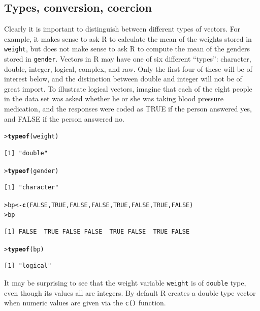 \documentclass[12pt,oneside]{book}\usepackage[]{graphicx}\usepackage[]{color}
\makeatletter
\newcommand{\hlnum}[1]{\textcolor[rgb]{0.686,0.059,0.569}{#1}}%
\newcommand{\hlstd}[1]{\textcolor[rgb]{0.345,0.345,0.345}{#1}}%
\newcommand{\hlkwb}[1]{\textcolor[rgb]{0.69,0.353,0.396}{#1}}%
\newcommand{\hlkwd}[1]{\textcolor[rgb]{0.737,0.353,0.396}{\textbf{#1}}}%
\newenvironment{kframe}{%
 \def\at@end@of@kframe{}%
 \ifinner\ifhmode%
  \def\at@end@of@kframe{\end{minipage}}%
  \begin{minipage}{\columnwidth}%
 \fi\fi%
 \def\FrameCommand##1{\hskip\@totalleftmargin \hskip-\fboxsep
 \colorbox{shadecolor}{##1}\hskip-\fboxsep
     \hskip-\linewidth \hskip-\@totalleftmargin \hskip\columnwidth}%
 \MakeFramed {\advance\hsize-\width
   \@totalleftmargin\z@ \linewidth\hsize
   \@setminipage}}%
 {\par\unskip\endMakeFramed%
 \at@end@of@kframe}
\newenvironment{knitrout}{}{} %
\makeatother
\begin{document}
\subsection{Types, conversion, coercion}
Clearly it is important to distinguish between different types of vectors. For example, it makes sense to ask R to calculate the mean of the weights stored in \verb+weight+, but does not make sense to ask R to compute the mean of the genders stored in \verb+gender+. Vectors in R may have one of six different ``types'': character, double, integer, logical, complex, and raw. Only the first four of these will be of interest below, and the distinction between double and integer will not be of great import. To illustrate logical vectors, imagine that each of the eight people in the data set was asked whether he or she was taking blood pressure medication, and the responses were coded as TRUE if the person answered yes, and FALSE if the person answered no. 
\begin{knitrout}
\color{fgcolor}\begin{kframe}
\begin{alltt}
\hlstd{> }\hlkwd{typeof}\hlstd{(weight)}
\end{alltt}
\begin{verbatim}
[1] "double"
\end{verbatim}
\begin{alltt}
\hlstd{> }\hlkwd{typeof}\hlstd{(gender)}
\end{alltt}
\begin{verbatim}
[1] "character"
\end{verbatim}
\begin{alltt}
\hlstd{> }\hlstd{bp} \hlkwb{<-} \hlkwd{c}\hlstd{(}\hlnum{FALSE}\hlstd{,} \hlnum{TRUE}\hlstd{,} \hlnum{FALSE}\hlstd{,} \hlnum{FALSE}\hlstd{,} \hlnum{TRUE}\hlstd{,} \hlnum{FALSE}\hlstd{,} \hlnum{TRUE}\hlstd{,} \hlnum{FALSE}\hlstd{)}
\hlstd{> }\hlstd{bp}
\end{alltt}
\begin{verbatim}
[1] FALSE  TRUE FALSE FALSE  TRUE FALSE  TRUE FALSE
\end{verbatim}
\begin{alltt}
\hlstd{> }\hlkwd{typeof}\hlstd{(bp)}
\end{alltt}
\begin{verbatim}
[1] "logical"
\end{verbatim}
\end{kframe}
\end{knitrout}
It may be surprising to see that the weight variable \verb+weight+ is of \verb+double+ type, even though its values all are integers. By default R creates a double type vector when numeric values are given via the \verb+c()+ function. 
\end{document}
